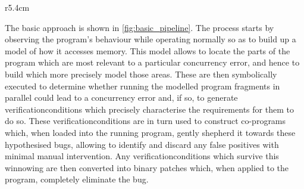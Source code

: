 \begin{wrapfigure}{r}{5.4cm}
  \vspace{-14pt}
  \vspace{-24pt}
\end{wrapfigure}
The basic approach is shown in \autoref{fig:basic_pipeline}.  The
process starts by observing the program's behaviour while operating
normally so as to build up a model of how it accesses memory.  This
model allows {\technique} to locate the parts of the program which are
most relevant to a particular concurrency error, and hence to build
\emph{\StateMachines} which more precisely model those areas.  These
     {\StateMachines} are then symbolically executed to determine
     whether running the modelled program fragments in parallel could
     lead to a concurrency error and, if so, to generate
     \glspl{verificationcondition} which precisely characterise the
     requirements for them to do so.  These
     \glspl{verificationcondition} are in turn used to construct
     co-programs which, when loaded into the running program, gently
     shepherd it towards these hypothesised bugs, allowing
     {\technique} to identify and discard any false positives with
     minimal manual intervention.  Any \glspl{verificationcondition}
     which survive this winnowing are then converted into binary
     patches which, when applied to the program, completely eliminate
     the bug.

